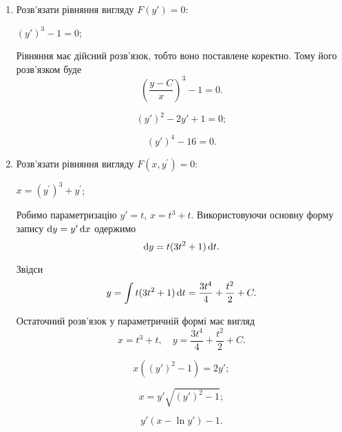 \begin{enumerate}
	\item Розв'язати рівняння вигляду $F(y') = 0$:
	\begin{example}
		$(y')^3 - 1 = 0$;
	\end{example}
	
	\begin{solution}
		Рівняння має дійсний розв'язок, тобто воно поставлене коректно. Тому його розв'язком буде \[\left(\frac{y - C}{x}\right)^3 - 1 = 0.\]
	\end{solution}
	
	\begin{multicols}{2}
		\begin{problem}
			\[(y')^2 - 2 y' + 1 = 0;\]
		\end{problem}
		
		\begin{problem}
			\[ (y')^4 - 16 = 0. \]
		\end{problem}
	\end{multicols}

	\item Розв'язати рівняння вигляду $F(x, y^\prime) = 0$:
	\begin{example}
		$x = \left( y^\prime \right)^3 + y^\prime$;
	\end{example}
	
	\begin{solution}
		Робимо параметризацію $y' = t$, $x = t^3 + t$. Використовуючи основну форму запису $\mathop{}\!\mathrm{d} y = y' \mathop{}\!\mathrm{d} x$ одержимо \[ \mathop{}\!\mathrm{d} y = t (3t^2 + 1) \mathop{}\!\mathrm{d} t.\]
	
		Звідси \[ y = \int t (3t^2 + 1) \mathop{}\!\mathrm{d} t = \frac{3t^4}{4} + \frac{t^2}{2} + C.\]
	
		Остаточний розв'язок у параметричній формі має вигляд\[ x = t^3 + t, \quad y = \frac{3t^4}{4} + \frac{t^2}{2} + C.\]
	\end{solution}

	\begin{multicols}{2}
		\begin{problem}
			\[ x ((y')^2 - 1) = 2y'; \]
		\end{problem}
		
		\begin{problem}
			\[ x = y' \sqrt{(y')^2 - 1}; \]
		\end{problem}
		
		\begin{problem}
		 	\[ y' (x - \ln y') - 1. \]
		\end{problem}
	\end{multicols}


\end{enumerate}
